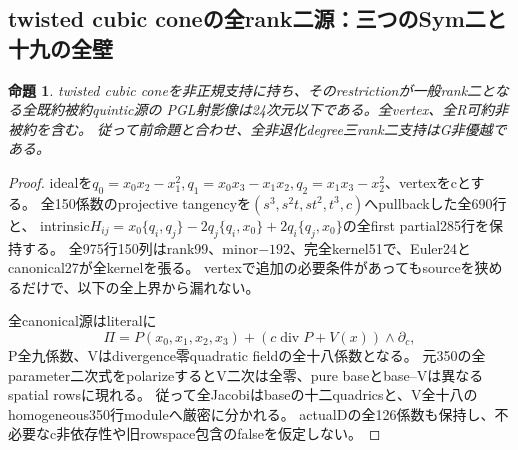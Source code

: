 \documentclass[a4paper,11pt]{ltjsarticle}
\newtheorem{proposition}{命題}[section]
\theoremstyle{definition}
\begin{document}
\subsection{twisted cubic coneの全rank二源：三つのSym二と十九の全壁}
\begin{proposition}\label{prop:cubic-cone-ranktwo-all-G}
twisted cubic coneを非正規支持に持ち、そのrestrictionが一般rank二となる全既約被約quintic源の
PGL射影像は24次元以下である。全vertex、全R可約非被約を含む。
従って前命題と合わせ、全非退化degree三rank二支持はG非優越である。
\end{proposition}
\begin{proof}
idealを$q_0=x_0x_2-x_1^2,q_1=x_0x_3-x_1x_2,q_2=x_1x_3-x_2^2$、vertexをcとする。
全150係数のprojective tangencyを$(s^3,s^2t,st^2,t^3,c)$へpullbackした全690行と、
intrinsic$H_{ij}=x_0\{q_i,q_j\}-2q_j\{q_i,x_0\}+2q_i\{q_j,x_0\}$の全first partial285行を保持する。
全975行150列はrank99、minor$-192$、完全kernel51で、Euler24とcanonical27が全kernelを張る。
vertexで追加の必要条件があってもsourceを狭めるだけで、以下の全上界から漏れない。

全canonical源はliteralに
\[
 \Pi=P(x_0,x_1,x_2,x_3)+(c\operatorname{div}P+V(x))\wedge\partial_c,
\]
P全九係数、Vはdivergence零quadratic fieldの全十八係数となる。
元350の全parameter二次式をpolarizeするとV二次は全零、pure baseとbase--Vは異なるspatial rowsに現れる。
従って全Jacobiはbaseの十二quadricsと、V全十八のhomogeneous350行moduleへ厳密に分かれる。
actualDの全126係数も保持し、不必要なc非依存性や旧rowspace包含のfalseを仮定しない。


\end{proof}
\end{document}
